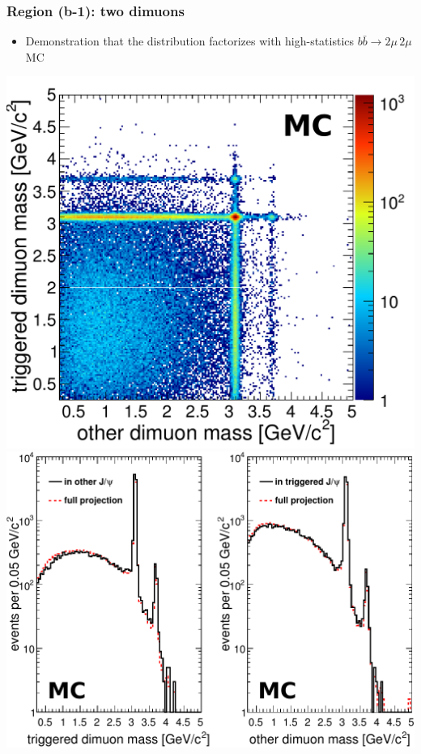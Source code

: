 \documentclass[compress]{beamer}
\begin{document}
\begin{frame}
\frametitle{Region (b-1): two dimuons}

\begin{itemize}
\item Demonstration that the distribution factorizes with
  high-statistics $b\bar{b} \to 2\mu \, 2\mu$ MC
\end{itemize}

\includegraphics[height=4 cm]{mc_dimudimu_wholecontrol.pdf} \hfill
\includegraphics[height=4 cm]{mc_wholecontrolregions_factorize.pdf}
\end{frame}
\end{document}
